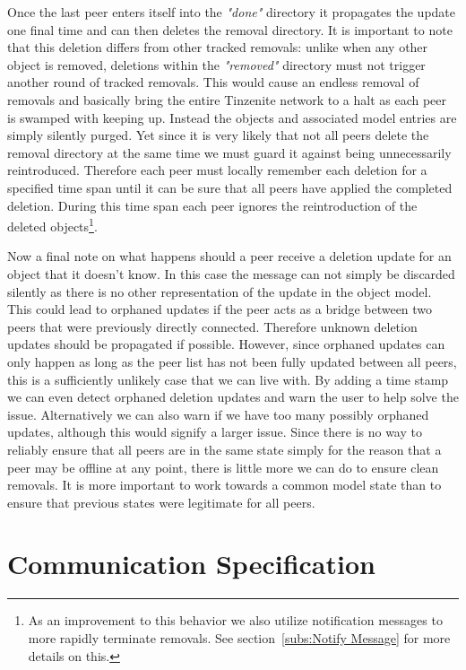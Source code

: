 Once the last peer enters itself into the \textit{"done"} directory it propagates the update one final time and can then deletes the removal directory.
It is important to note that this deletion differs from other tracked removals: unlike when any other object is removed, deletions within the \textit{"removed"} directory must not trigger another round of tracked removals.
This would cause an endless removal of removals and basically bring the entire Tinzenite network to a halt as each peer is swamped with keeping up.
Instead the objects and associated model entries are simply silently purged.
Yet since it is very likely that not all peers delete the removal directory at the same time we must guard it against being unnecessarily reintroduced.
Therefore each peer must locally remember each deletion for a specified time span until it can be sure that all peers have applied the completed deletion.
During this time span each peer ignores the reintroduction of the deleted objects\footnote{As an improvement to this behavior we also utilize notification messages to more rapidly terminate removals. See section~\ref{subs:Notify Message} for more details on this.}.

Now a final note on what happens should a peer receive a deletion update for an object that it doesn't know.
In this case the message can not simply be discarded silently as there is no other representation of the update in the object model.
This could lead to orphaned updates if the peer acts as a bridge between two peers that were previously directly connected.
Therefore unknown deletion updates should be propagated if possible.
However, since orphaned updates can only happen as long as the peer list has not been fully updated between all peers, this is a sufficiently unlikely case that we can live with.
By adding a time stamp we can even detect orphaned deletion updates and warn the user to help solve the issue.
Alternatively we can also warn if we have too many possibly orphaned updates, although this would signify a larger issue.
Since there is no way to reliably ensure that all peers are in the same state simply for the reason that a peer may be offline at any point, there is little more we can do to ensure clean removals.
It is more important to work towards a common model state than to ensure that previous states were legitimate for all peers.

\section{Communication Specification}
\label{sec:Communication Specification}

